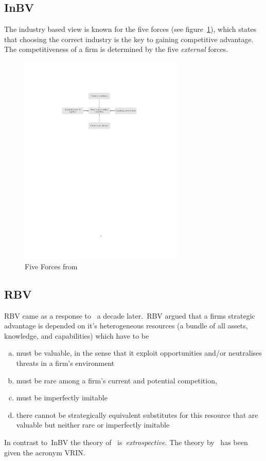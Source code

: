 \subsection{\glsdesc{InBV}}
The industry based view is known for the five forces (see figure~\ref{fig:5forces}), which states that choosing the correct industry is the key to gaining competitive advantage. The competitiveness of a firm is determined by the five \emph{external} forces.

\begin{figure}[htbp]%
       \centering%
	\includegraphics[width=0.7\textwidth]{5forces}%
 	\caption{Five Forces from~\cite{Porter:1980}}%
 	\label{fig:5forces}%
\end{figure}

\subsection{\glsdesc{RBV}}

\Gls{RBV} came as a response to~\cite{Porter:1980} a decade later.~\Gls{RBV} argued that a firms strategic advantage is depended on it's heterogeneous resources (a bundle of all assets, knowledge, and capabilities) which have to be
\begin{enumerate}[(a)]
\item must be valuable, in the sense that it exploit opportunities and/or neutralises threats in a firm’s environment
\item must be rare among a firm’s current and potential competition, 
\item must be imperfectly imitable
\item  there cannot be strategically equivalent substitutes for this resource that are valuable but neither rare or imperfectly imitable 
\end{enumerate} 
In contrast to~\gls{InBV} the theory of~\cite{Barney:1991} is~\emph{extrospective}. 
The theory by~\cite{Barney:1991}  has been given the acronym VRIN\@.\\

